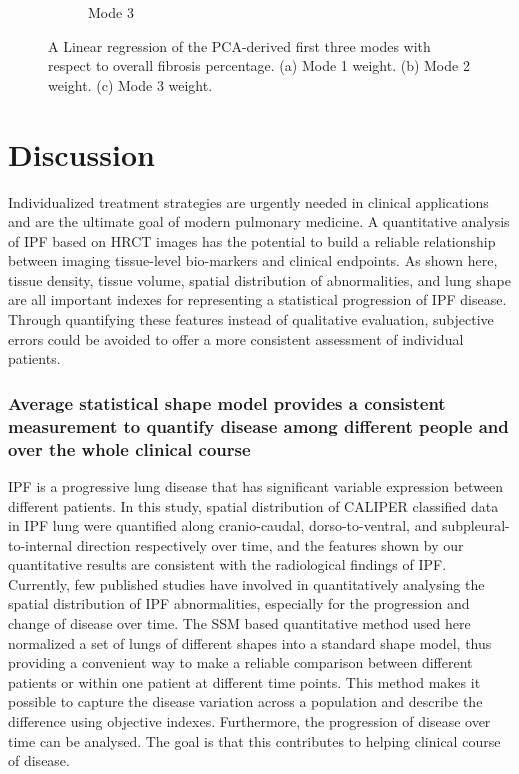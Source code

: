\begin{figure}[H]
\begin{subfigure}{.72\linewidth}
  \caption{Mode 3}
  \label{fig:ShapeVSFibrosis-c}
\end{subfigure}
\caption{ A Linear regression of the PCA-derived first three modes with respect to overall fibrosis percentage. (a) Mode 1 weight. (b) Mode 2 weight. (c) Mode 3  weight.}
\label{fig:ShapeVSFibrosis}
\end{figure}

\section{Discussion} \label{QuantitativeDiscussion}
Individualized treatment strategies are urgently needed in clinical applications and are the ultimate goal of modern pulmonary medicine. A quantitative analysis of IPF based on HRCT images has the potential to build a reliable relationship between imaging tissue-level bio-markers and clinical endpoints. As shown here, tissue density, tissue volume, spatial distribution of abnormalities, and lung shape are all important indexes for representing a statistical progression of IPF disease. Through quantifying these features instead of qualitative evaluation, subjective errors could be avoided to offer a more consistent assessment of individual patients.  

\subsubsection{Average statistical shape model provides a consistent measurement to quantify disease among different people and over the whole clinical course}
IPF is a progressive lung disease that has significant variable expression between different patients. In this study, spatial distribution of CALIPER classified data in IPF lung were quantified along cranio-caudal, dorso-to-ventral, and subpleural-to-internal direction respectively over time, and the features shown by our quantitative results are consistent with the radiological findings of IPF. Currently, few published studies have involved in quantitatively analysing the spatial distribution of IPF abnormalities, especially for the progression and change of disease over time. The SSM based quantitative method used here normalized a set of lungs of different shapes into a standard shape model, thus providing a convenient way to make a reliable comparison between different patients or within one patient at different time points. This method makes it possible to capture the disease variation across a population and describe the difference using objective indexes. Furthermore, the progression of disease over time can be analysed. The goal is that this contributes to helping clinical course of disease. 

